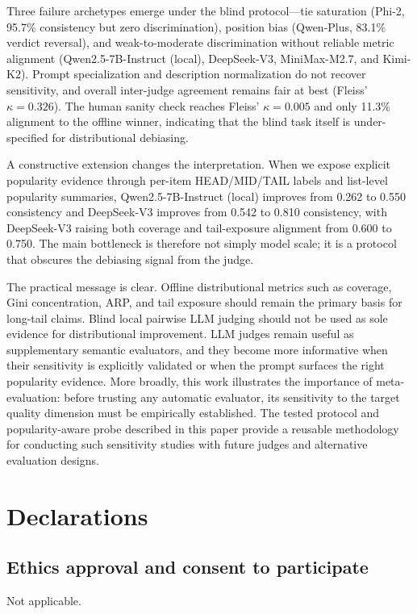 \documentclass[pdflatex,sn-basic,referee,lineno]{sn-jnl}
\begin{document}
Three failure archetypes emerge under the blind protocol---tie saturation (Phi-2, 95.7\% consistency but zero discrimination), position bias (Qwen-Plus, 83.1\% verdict reversal), and weak-to-moderate discrimination without reliable metric alignment (Qwen2.5-7B-Instruct (local), DeepSeek-V3, MiniMax-M2.7, and Kimi-K2). Prompt specialization and description normalization do not recover sensitivity, and overall inter-judge agreement remains fair at best (Fleiss' $\kappa = 0.326$). The human sanity check reaches Fleiss' $\kappa = 0.005$ and only 11.3\% alignment to the offline winner, indicating that the blind task itself is under-specified for distributional debiasing.

A constructive extension changes the interpretation. When we expose explicit popularity evidence through per-item HEAD/MID/TAIL labels and list-level popularity summaries, Qwen2.5-7B-Instruct (local) improves from 0.262 to 0.550 consistency and DeepSeek-V3 improves from 0.542 to 0.810 consistency, with DeepSeek-V3 raising both coverage and tail-exposure alignment from 0.600 to 0.750. The main bottleneck is therefore not simply model scale; it is a protocol that obscures the debiasing signal from the judge.

The practical message is clear. Offline distributional metrics such as coverage, Gini concentration, ARP, and tail exposure should remain the primary basis for long-tail claims. Blind local pairwise LLM judging should not be used as sole evidence for distributional improvement. LLM judges remain useful as supplementary semantic evaluators, and they become more informative when their sensitivity is explicitly validated or when the prompt surfaces the right popularity evidence. More broadly, this work illustrates the importance of meta-evaluation: before trusting any automatic evaluator, its sensitivity to the target quality dimension must be empirically established. The tested protocol and popularity-aware probe described in this paper provide a reusable methodology for conducting such sensitivity studies with future judges and alternative evaluation designs.

\section*{Declarations}

\subsection*{Ethics approval and consent to participate}
Not applicable.
\end{document}
